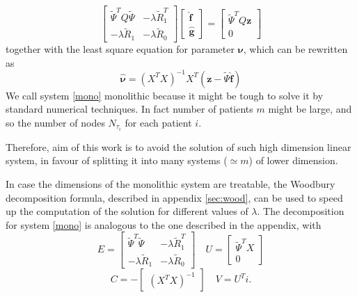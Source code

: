 \begin{equation}
	\label{mono}
	\begin{bmatrix}
		\tilde{\Psi}^TQ\tilde{\Psi} & -\lambda \tilde{R}_1^T \\
		-\lambda \tilde{R}_1        & -\lambda \tilde{R}_0
	\end{bmatrix}
	\begin{bmatrix}
		\hat{\bm{f}} \\
		\hat{\bm{g}}
	\end{bmatrix}
	=
	\begin{bmatrix}
		\tilde{\Psi}^T Q\bm{z} \\
		0
	\end{bmatrix}
\end{equation}
together with the least square equation for parameter $\bm{\nu}$,
which can be rewritten as
\begin{equation}
	\label{nu}
	\hat{\bm{\nu}}=\left(X^TX\right)^{-1}X^T(\bm{z}-\tilde{\Psi}\hat{\bm{f}})
\end{equation}
We call system \ref{mono} monolithic because it might be tough to
solve it by standard numerical techniques. In fact number of patients $m$ might
be large, and so the number of nodes $N_{\tau_i}$ for each patient $i$.

Therefore, aim of this work is to avoid the solution of such high dimension
linear system, in favour of splitting it into many systems ($\simeq m$) of
lower dimension.

In case the dimensions of the monolithic system are treatable, the Woodbury
decomposition formula, described in appendix \ref{sec:wood}, can be used to
speed up the computation of the solution for different values of $\lambda$. The
decomposition for system \ref{mono} is analogous to the one described in the
appendix, with
\begin{equation}
	\label{eq:wootilde}
	E =
	\begin{bmatrix}
		\tilde{\Psi}^T\tilde{\Psi} & -\lambda \tilde{R}_1^T \\
		-\lambda \tilde{R}_1       & -\lambda \tilde{R}_0
	\end{bmatrix}
	\quad U =
	\begin{bmatrix}
		\tilde{\Psi}^TX \\
		0
	\end{bmatrix}
\end{equation}
\begin{equation*}
	C = -
	\begin{bmatrix}
		\left(X^TX\right)^{-1}
	\end{bmatrix}
	\quad V = U^Ti.
\end{equation*}

